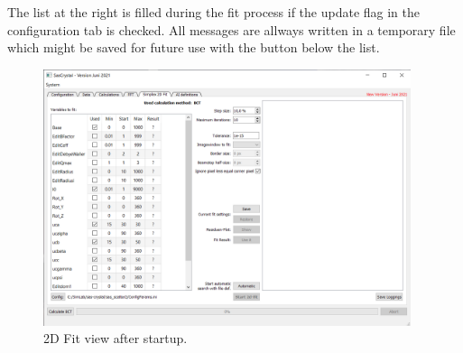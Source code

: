 \documentclass[11pt]{article} %
\begin{document}
The list at the right is filled during the fit process if the update flag in the configuration tab is checked. All messages are allways written in a temporary file which might be saved for future use with the button below the list.

\begin{figure}[H]
 \centering
 \includegraphics[width=0.96\textwidth]{main-fit-start.png}
 \caption{2D Fit view after startup.}
 \label{fig:fitstart}
\end{figure}
\end{document}
